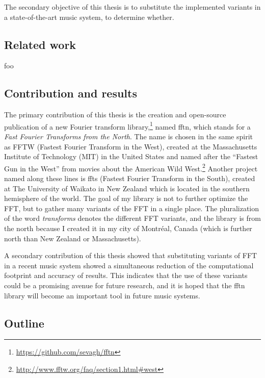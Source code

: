 \documentclass[letter,12pt,notitlepage]{article}
\begin{document}
The secondary objective of this thesis is to substitute the implemented variants in a state-of-the-art music system, to determine whether.

\subsection{Related work}

foo

\subsection{Contribution and results}

The primary contribution of this thesis is the creation and open-source publication of a new Fourier transform library,\footnote{\href{https://github.com/sevagh/fftn}{https://github.com/sevagh/fftn}} named fftn, which stands for a \textit{Fast Fourier Transforms from the North}.  The name is chosen in the same spirit as FFTW \cite{fftw1} (Fastest Fourier Transform in the West), created at the Massachusetts Institute of Technology (MIT) in the United States and named after the ``Fastest Gun in the West'' from movies about the American Wild West.\footnote{\href{http://www.fftw.org/faq/section1.html\#west}{http://www.fftw.org/faq/section1.html\#west}} Another project named along these lines is ffts \cite{ffts} (Fastest Fourier Transform in the South), created at The University of Waikato in New Zealand which is located in the southern hemisphere of the world. The goal of my library is not to further optimize the FFT, but to gather many variants of the FFT in a single place. The pluralization of the word \textit{transforms} denotes the different FFT variants, and the library is from the north because I created it in my city of Montr{\'e}al, Canada (which is further north than New Zealand or Massachusetts).

A secondary contribution of this thesis showed that substituting variants of FFT in a recent music system  showed a simultaneous reduction of the computational footprint and accuracy of results. This indicates that the use of these variants could be a promising avenue for future research, and it is hoped that the fftn library will become an important tool in future music systems.

\subsection{Outline}
\end{document}
